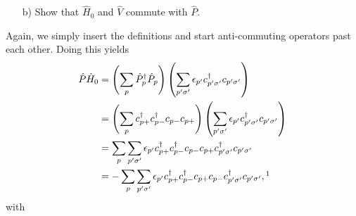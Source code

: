 \documentclass[a4paper]{article}
\newcommand{\eq} [1]{Eq.\ (\ref{eq:#1})}
\newcommand{\nn}{\nonumber}
\newcommand{\cpp}{c_{p+}}
\newcommand{\cpm}{c_{p-}}
\begin{document}
\begin{exframe}
\begin{itemize}
  \item[b)] Show that $\hat H_0$ and $\hat V$ commute with $\hat P$.
\end{itemize}
\end{exframe}
Again, we simply insert the definitions and start anti-commuting operators past each other. Doing this yields
\begin{align}
 \hat P \hat H_0 &= \left(  \sum_p \hat P^\dagger_p \hat P_p\right) \left(  \sum_{p'\sigma'} \epsilon_{p'} c_{p'\sigma'}^\dagger c_{p'\sigma'} \right) \nn\\
%
&= \left(  \sum_p \cpp^\dagger \cpm^\dagger \cpm \cpp \right) \left(  \sum_{p'\sigma'} \epsilon_{p'} c_{p'\sigma'}^\dagger c_{p'\sigma'} \right)  \nn\\
%
&= \sum_p \sum_{p'\sigma'} \epsilon_{p'} \cpp^\dagger \cpm^\dagger \cpm \cpp   c_{p'\sigma'}^\dagger c_{p'\sigma'} \nn\\
%
&= -\sum_p \sum_{p'\sigma'} \epsilon_{p'} \cpp^\dagger \cpm^\dagger \cpp \cpm   c_{p'\sigma'}^\dagger c_{p'\sigma'},  \footnote{Note the minus sign (I had the wrong definitions of the $\hat P$ operator while typing this in, and didnt feel like redoing everything up to \eq{1} so I snuck in a sign change here).}
\end{align}
with
\end{document}
